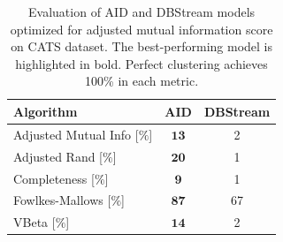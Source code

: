\documentclass{article}
\begin{document}
\begin{enumerate}
        \begin{table}[htbp]
          \caption{Evaluation of AID and DBStream models optimized for adjusted mutual information score on CATS dataset. The best-performing model is highlighted in bold. Perfect clustering achieves 100\% in each metric.}
          \begin{center}
            \label{tab:perf_comp_cluster}
            \begin{tabular}{|l|c|c|}
              \hline
              \textbf{Algorithm}          & AID               & DBStream \\
              \hline
              Adjusted Mutual Info [$\%$] & $\boldsymbol{13}$ & 2        \\
              \hline
              Adjusted Rand [$\%$]        & $\boldsymbol{20}$ & 1        \\
              \hline
              Completeness [$\%$]         & $\boldsymbol{9}$  & 1        \\
              \hline
              Fowlkes-Mallows [$\%$]      & $\boldsymbol{87}$ & 67       \\
              \hline
              VBeta [$\%$]                & $\boldsymbol{14}$ & 2        \\
              \hline
            \end{tabular}
          \end{center}
        \end{table}



\end{enumerate}
\end{document}
